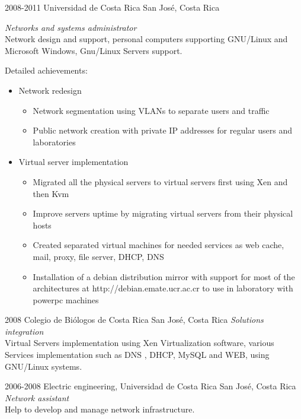 \documentclass[]{friggeri-cv} %
\begin{document}
\begin{entrylist}
\entry
{2008-2011}
{Universidad de Costa Rica}
{San José, Costa Rica}
{\emph{Networks and systems administrator}\\
Network design and support, personal computers supporting GNU/Linux and Microsoft Windows, Gnu/Linux Servers support.

Detailed achievements:
\begin{itemize}
\item Network redesign
\begin{itemize}
\item Network segmentation using VLANs to separate users and traffic
\item Public network creation with private IP addresses for regular users and laboratories
\end{itemize}
\item Virtual server implementation
\begin{itemize}
\item Migrated all the physical servers to virtual servers first using Xen and then Kvm
\item Improve servers uptime by migrating virtual servers from their physical hosts
\item Created separated virtual machines for needed services as web cache, mail, proxy, file server, DHCP, DNS
\item Installation of a debian distribution mirror with support for most of the architectures at http://debian.emate.ucr.ac.cr to use in laboratory with powerpc machines
\end{itemize}
\end{itemize}
}
\end{entrylist}

\begin{entrylist}
\entry
{2008}
{Colegio de Biólogos de Costa Rica}
{San José, Costa Rica}
{\emph{Solutions integration}\\
Virtual Servers implementation using Xen Virtualization software, various Services implementation such as DNS , DHCP, MySQL and WEB, using GNU/Linux systems.
}

\entry
{2006-2008}
{Electric engineering, Universidad de Costa Rica}
{San José, Costa Rica}
{\emph{Network assistant}\\
Help to develop and manage network infrastructure.
}
\end{entrylist}
\pagebreak
\end{document}
